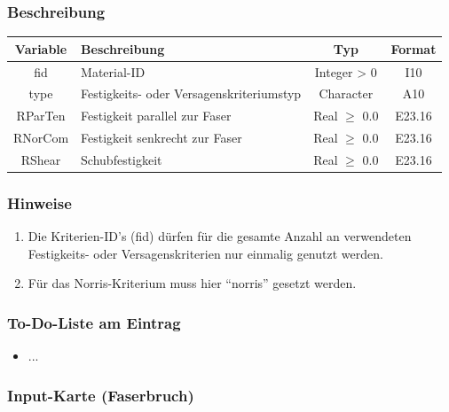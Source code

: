\documentclass[11pt,titlepage,listof=totoc,bibliography=totoc,twoside]{scrreprt}
\begin{document}
{{\subsubsection{Beschreibung}

\begin{tabularx}{\textwidth}{cXcc}
\toprule
Variable& Beschreibung														& Typ			& Format\\
\midrule
fid	& Material-ID														& Integer > 0		& I10	\\
type	& Festigkeits- oder Versagenskriteriumstyp										& Character		& A10	\\
RParTen	& Festigkeit parallel zur Faser												& Real $\ge$ 0.0	& E23.16\\
RNorCom	& Festigkeit senkrecht zur Faser											& Real $\ge$ 0.0	& E23.16\\
RShear	& Schubfestigkeit 													& Real $\ge$ 0.0	& E23.16\\
\bottomrule
\end{tabularx}

\subsubsection{Hinweise}

\begin{enumerate}
\item Die Kriterien-ID's (fid) dürfen für die gesamte Anzahl an verwendeten Festigkeits- oder Versagenskriterien nur einmalig genutzt werden.
\item Für das Norris-Kriterium muss hier ``norris'' gesetzt werden.
\end{enumerate}

\subsubsection{To-Do-Liste am Eintrag}

\begin{itemize}
\item ...
\end{itemize}

\newpage

\subsubsection{Input-Karte (Faserbruch)}

}}
\end{document}
